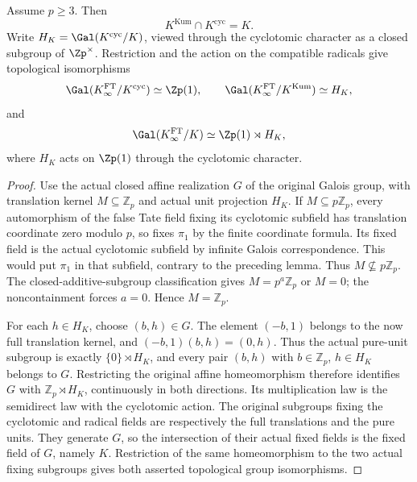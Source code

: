 \begin{lemma}
\label{ft:galois-structure}
\leanok
{}
Assume $p\geq3$. Then
\[
 K^{\mathrm{Kum}}\cap K^{\mathrm{cyc}}=K.
\]
Write $H_K=\Gal(K^{\mathrm{cyc}}/K)$, viewed through the cyclotomic
character as a closed subgroup of $\Zp^\times$. Restriction and the action
on the compatible radicals give topological isomorphisms
\[
 \Gal(K^{\mathrm{FT}}_\infty/K^{\mathrm{cyc}})\simeq\Zp(1),\qquad
 \Gal(K^{\mathrm{FT}}_\infty/K^{\mathrm{Kum}})\simeq H_K,
\]
and
\[
 \Gal(K^{\mathrm{FT}}_\infty/K)\simeq\Zp(1)\rtimes H_K,
\]
where $H_K$ acts on $\Zp(1)$ through the cyclotomic character.
\end{lemma}
\begin{proof}
Use the actual closed affine realization $G$ of the original
Galois group, with translation kernel $M\subseteq\mathbb Z_p$
and actual unit projection $H_K$.
If $M\subseteq p\mathbb Z_p$, every automorphism of the false Tate
field fixing its cyclotomic subfield has translation coordinate
zero modulo $p$, so fixes $\pi_1$ by the finite coordinate formula.
Its fixed field is the actual cyclotomic subfield by infinite
Galois correspondence. This would put $\pi_1$ in that subfield,
contrary to the preceding lemma.
Thus $M\nsubseteq p\mathbb Z_p$.
The closed-additive-subgroup classification gives
$M=p^a\mathbb Z_p$ or $M=0$; the noncontainment forces $a=0$.
Hence $M=\mathbb Z_p$.

For each $h\in H_K$, choose $(b,h)\in G$.
The element $(-b,1)$ belongs to the now full translation kernel,
and $(-b,1)(b,h)=(0,h)$.
Thus the actual pure-unit subgroup is exactly $\{0\}\rtimes H_K$,
and every pair $(b,h)$ with $b\in\mathbb Z_p$, $h\in H_K$
belongs to $G$. Restricting the original affine homeomorphism
therefore identifies $G$ with $\mathbb Z_p\rtimes H_K$,
continuously in both directions. Its multiplication law is the
semidirect law with the cyclotomic action.
The original subgroups fixing the cyclotomic and radical fields
are respectively the full translations and the pure units.
They generate $G$, so the intersection of their actual fixed
fields is the fixed field of $G$, namely $K$.
Restriction of the same homeomorphism to the two actual fixing
subgroups gives both asserted topological group isomorphisms.
\end{proof}


